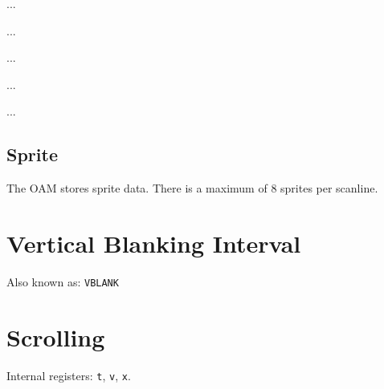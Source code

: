  ... 

 ... 

 ... 

 ... 

 ... 

\subsection{Sprite}

The OAM stores sprite data.
There is a maximum of 8 sprites per scanline.

\section{Vertical Blanking Interval}

Also known as: \texttt{VBLANK}

\section{Scrolling}

Internal registers: \texttt{t}, \texttt{v}, \texttt{x}.
